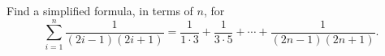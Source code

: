 Find a simplified formula, in terms of $n$, for
\[\sum_{i=1}^{n}\dfrac{1}{(2i-1)(2i+1)}=\dfrac{1}{1\cdot3}+\dfrac{1}{3\cdot5}+\cdots+\dfrac{1}{(2n-1)(2n+1)}.\]
